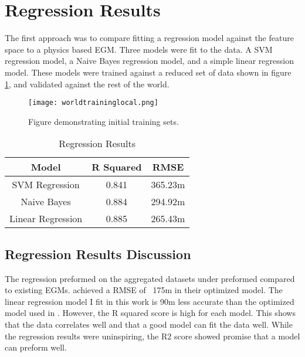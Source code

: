 \section{Regression Results}
The first approach was to compare fitting a regression model against the feature space to a physics based \ac{EGM}.
Three models were fit to the data. 
A SVM regression model, a Naive Bayes regression model, and a simple linear regression model.
These models were trained against a reduced set of data shown in figure \ref{fig:trainset}, and validated against the rest of the world.

\begin{figure}[h]
    \centering
    \texttt{[image: worldtraininglocal.png]}
    \caption{Figure demonstrating initial training sets.}
    \label{fig:trainset}
\end{figure}

\begin{center}
    \begin{table}[htb]
        \begin{tabular}{|c c c|}
            \hline
				\textbf{Model} & \textbf{R Squared} & \textbf{RMSE} \\
				\hline
				SVM Regression & 0.841 & 365.23m \\
				Naive Bayes & 0.884 & 294.92m \\
				Linear Regression & 0.885 & 265.43m \\
				\hline
        \end{tabular}
        \label{table:REGRESSION_RESULTS}
        \caption{Regression Results}
    \end{table}
\end{center}

\subsection{Regression Results Discussion}
The regression preformed on the aggregated datasets under preformed compared to existing \ac{EGM}s.
\cite{jena2012prediction} achieved a \ac{RMSE} of ~175m in their optimized model.
The linear regression model I fit in this work is 90m less accurate than the optimized model used in \cite{jena2012prediction}.
However, the R squared score is high for each model. 
This shows that the data correlates well and that a good model can fit the data well.
While the regression results were uninspiring, the R2 score showed promise that a model can preform well.



